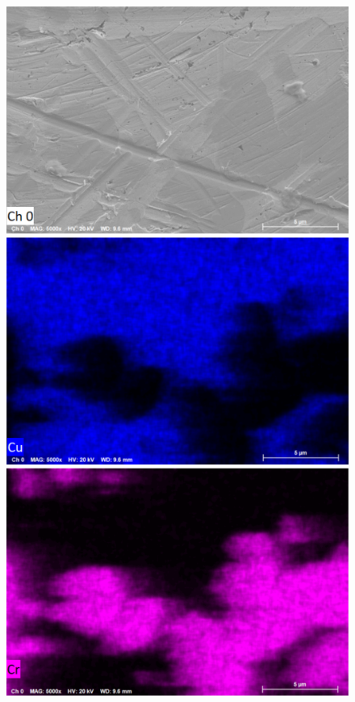 \documentclass[a4paper,12pt]{article} %
\begin{document}
\begin{figure}[h]
\centering
\begin{minipage}{0.49\textwidth}
\includegraphics[width=\textwidth]{spectrum_0.png}
\vspace{-2em}
\end{minipage}
\begin{minipage}{0.49\textwidth}
\includegraphics[width=\textwidth]{spectrum_cu.png}
\vspace{-2em}
\end{minipage}
\begin{minipage}{0.49\textwidth}
\vspace{0.5em}
\includegraphics[width=\textwidth]{spectrum_cr.png}

\end{minipage}
\end{figure}
\end{document}
